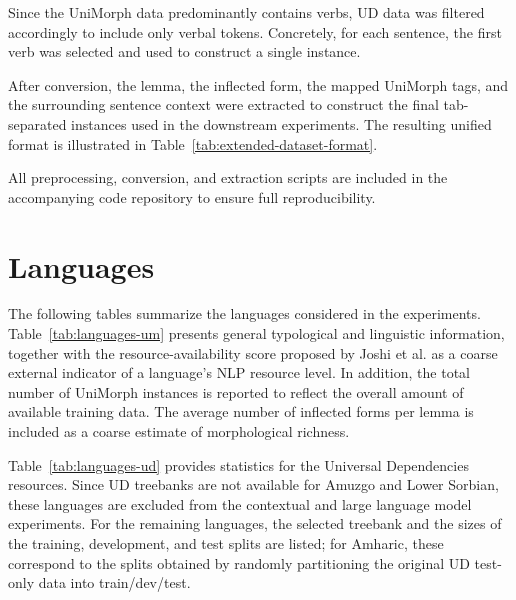 Since the UniMorph data predominantly contains verbs, \ac{UD} data was filtered accordingly to include only verbal tokens. Concretely, for each sentence, the first verb was selected and used to construct a single instance.

After conversion, the lemma, the inflected form, the mapped UniMorph tags, and the surrounding sentence context were extracted to construct the final tab-separated instances used in the downstream experiments. The resulting unified format is illustrated in Table~\ref{tab:extended-dataset-format}.

\begin{table}[h]
\centering
{}%
\caption{Example instance of the unified tab-separated format used in this work.}
\label{tab:extended-dataset-format}
\end{table}

All preprocessing, conversion, and extraction scripts are included in the accompanying code repository to ensure full reproducibility.

\section{Languages}

The following tables summarize the languages considered in the experiments. Table~\ref{tab:languages-um} presents general typological and linguistic information, together with the resource-availability score proposed by Joshi et al. \parencite*{joshi-etal-2020-state} as a coarse external indicator of a language's \ac{NLP} resource level. In addition, the total number of UniMorph instances is reported to reflect the overall amount of available training data. The average number of inflected forms per lemma is included as a coarse estimate of morphological richness. 

Table~\ref{tab:languages-ud} provides statistics for the Universal Dependencies resources. Since UD treebanks are not available for Amuzgo and Lower Sorbian, these languages are excluded from the contextual and large language model experiments. For the remaining languages, the selected treebank and the sizes of the training, development, and test splits are listed; for Amharic, these correspond to the splits obtained by randomly partitioning the original \ac{UD} test-only data into train/dev/test.

